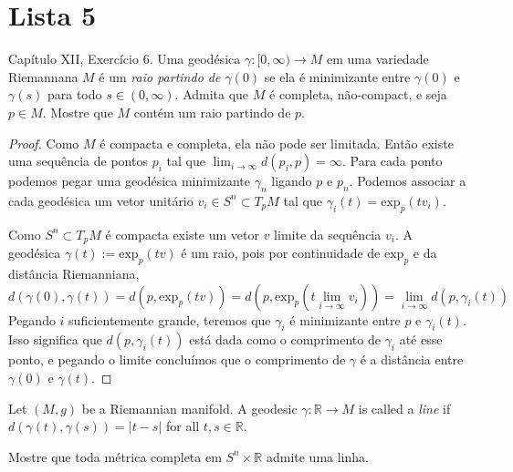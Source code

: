 \section{Lista 5}
\label{section-lista-5}

\begin{exercise}
\label{exercise-l5-5}
\cite{doc} Capítulo XII, Exercício 6. Uma geodésica $\gamma:[0,\infty)\to M$ em
uma variedade Riemannana $M$ é um {\it raio partindo de $\gamma(0)$} se ela é
minimizante entre $\gamma(0)$ e $\gamma(s)$ para todo  $s \in (0,\infty)$.
Admita que $M$ é completa, não-compact, e seja $p \in M$. Mostre que $M$ contém
um raio partindo de $p$.
\end{exercise}

\begin{proof}
Como $M$ é compacta e completa, ela não pode ser limitada. Então
existe uma sequência de pontos $p_i$  tal que $\lim_{i \to \infty}
d(p_i,p)=\infty$. Para cada ponto podemos pegar uma geodésica minimizante
$\gamma_n$ ligando $p$ e $p_n$. Podemos associar a cada geodésica um vetor
unitário $v_i \in S^n \subset T_pM$ tal que $\gamma_i(t)=\text{exp}_p(tv_i)$.

Como $S^n \subset T_pM$ é compacta existe um vetor $v$ limite da sequência
$v_i$. A geodésica $\gamma(t):=\text{exp}_p(tv)$ é um raio, pois por
continuidade de $\text{exp}_p$ e da distância Riemanniana,
$$
d(\gamma(0),\gamma(t))=d\left(p,\text{exp}_p(tv)\right)
=d\left(p,\text{exp}_p\left(t\lim_{i \to \infty} v_i\right)\right)
=\lim_{i \to \infty} d(p,\gamma_i (t))
$$
Pegando $i$ suficientemente grande, teremos que $\gamma_i$ é minimizante entre
$p$ e $\gamma_i(t)$. Isso significa que $d(p,\gamma_i(t))$ está dada como o
comprimento de $\gamma_i$ até esse ponto, e pegando o limite concluímos que o
comprimento de $\gamma$ é a distância entre $\gamma(0)$ e $\gamma(t)$.
\end{proof}

\begin{definition}
\label{definition-line-riemannian-manifold}
Let $(M,g)$ be a Riemannian manifold. A geodesic $\gamma:\mathbb{R} \to M$ is
called a {\it line} if $d(\gamma(t),\gamma(s))=|t-s|$ for all $t,s \in
\mathbb{R}$.
\end{definition}

\begin{exercise}
\label{exercise-l5-6}
Mostre que toda métrica completa em $S^n \times \mathbb{R}$ admite uma linha.
\end{exercise}

